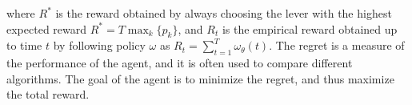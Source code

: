 \noindent where $R^{*}$ is the reward obtained by always choosing the lever with the highest expected reward $R^{*}=T\max_{k}\{p_{k}\}$, and $R_{t}$ is the empirical reward obtained up to time $t$ by following policy $\omega$ as $R_{t}=\sum^{T}_{t=1}\omega_{\theta}(t)$.
The regret is a measure of the performance of the agent, and it is often used to compare different algorithms. The goal of the agent is to minimize the regret, and thus maximize the total reward.



